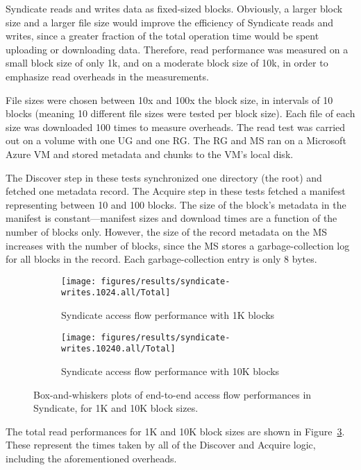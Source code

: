 Syndicate reads and writes data as fixed-sized blocks.  Obviously, a larger
block size and a larger file size would improve the efficiency of Syndicate
reads and writes, since a greater fraction of the total operation time would be
spent uploading or downloading data.  Therefore, read performance was measured
on a small block size of only 1k, and on a moderate block size of 10k, in order
to emphasize read overheads in the measurements.

File sizes were chosen between 10x and 100x the block size, in intervals of 10
blocks (meaning 10 different file sizes were tested per block size).  Each file
of each size was downloaded 100 times to measure overheads.
The read test was carried out on a volume with one UG and one RG.
The RG and MS ran on a Microsoft
Azure VM and stored metadata and chunks to the VM's local disk.

The Discover step in these tests synchronized one directory (the root) and fetched
one metadata record.  The Acquire step in these tests fetched a manifest representing between 10 and
100 blocks.  The size of the block's metadata in the manifest is
constant---manifest sizes and download times are a function of the number of
blocks only.  However, the size of the record metadata on the MS increases with
the number of blocks, since the MS stores a garbage-collection log for all
blocks in the record.  Each garbage-collection entry is only 8 bytes.


\begin{figure}[htp!]
   \centering
   \begin{subfigure}[b]{.8\textwidth}
      \texttt{[image: figures/results/syndicate-writes.1024.all/Total]}
      \label{fig:syndicate-read-total-1k}
      \caption{Syndicate access flow performance with 1K blocks}
   \end{subfigure}
   \begin{subfigure}[b]{.8\textwidth}
      \texttt{[image: figures/results/syndicate-writes.10240.all/Total]}
      \label{fig:syndicate-read-total-1k}
      \caption{Syndicate access flow performance with 10K blocks}
   \end{subfigure}
   \caption{Box-and-whiskers plots of end-to-end access flow performances in
   Syndicate, for 1K and 10K block sizes.}
   \label{fig:syndicate-read-total}
\end{figure}

The total read performances for 1K and 10K block sizes are shown in
Figure~\ref{fig:syndicate-read-total}.  These represent the times taken by all
of the Discover and Acquire logic, including the aforementioned overheads.

